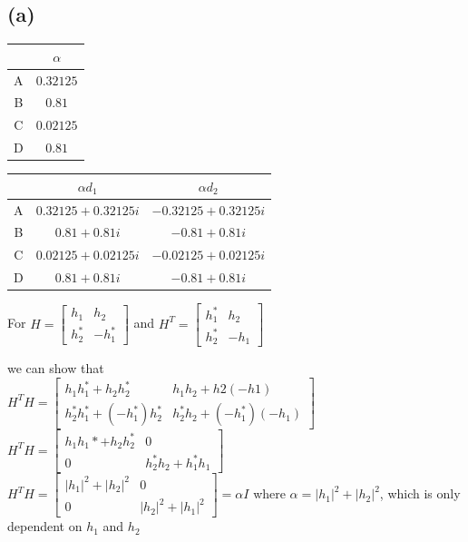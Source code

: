 \documentclass[]{article}
\begin{document}
	\subsection*{(a)}
	\begin{center}
		\begin{tabular}{ |c|c| } 
			\hline
			& $\alpha$ \\
			\hline
			A & $0.32125$ \\
			B & $0.81$ \\
			C & $0.02125$ \\
			D & $0.81$ \\
			\hline
		\end{tabular}
	\end{center}
	\begin{center}
		\begin{tabular}{ |c||c|c| } 
			\hline
			  & $\alpha d_1$ & $\alpha d_2$ \\
			\hline
			A & $0.32125+0.32125i$ & $-0.32125+0.32125i$ \\
			B & $0.81+0.81i$ & $-0.81+0.81i$ \\
			C & $0.02125+0.02125i$ & $-0.02125+0.02125i$ \\
			D & $0.81+0.81i$ & $-0.81+0.81i$ \\
			\hline
		\end{tabular}
	\end{center}
	
	For $H = \begin{bmatrix} h_1 & h_2 \\ h_2^* & -h_1^* \end{bmatrix}$
	and
	$H^T = \begin{bmatrix}h_1^* & h_2 \\ h_2^* & -h_1\end{bmatrix}$
	
	 we can show that\\
	$H^TH = \begin{bmatrix} h_1 h_1^* + h_2h_2^* & h_1h_2 + h2 (-h1) \\ h_2^*h_1^* + (-h_1^*)h_2^* & h_2^*h_2 + (-h_1^*)(-h_1) \end{bmatrix}$\\
	
	$H^TH = \begin{bmatrix} h_1 h_1* + h_2h_2^* & 0 \\ 0 & h_2^*h_2 + h_1^*h_1 \end{bmatrix}$
\\
	$H^TH = \begin{bmatrix} |h_1|^2 + |h_2|^2 & 0 \\ 0 & |h_2|^2 + |h_1|^2 \end{bmatrix} = \alpha I$ where $\alpha = |h_1|^2 + |h_2|^2$, which is only dependent on $h_1$ and $h_2$
	
\end{document}
